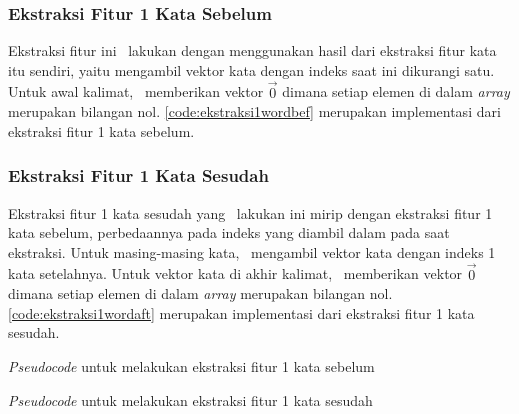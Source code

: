 \subsubsection{Ekstraksi Fitur 1 Kata Sebelum}
Ekstraksi fitur ini \saya~lakukan dengan menggunakan hasil dari ekstraksi fitur kata itu sendiri, yaitu mengambil vektor kata dengan indeks saat ini dikurangi satu. Untuk awal kalimat, \saya~memberikan vektor $ \vec{0} $ dimana setiap elemen di dalam \textit{array} merupakan bilangan nol. \ref{code:ekstraksi1wordbef} merupakan implementasi dari ekstraksi fitur 1 kata sebelum.

\subsubsection{Ekstraksi Fitur 1 Kata Sesudah}
Ekstraksi fitur 1 kata sesudah yang \saya~lakukan ini mirip dengan ekstraksi fitur 1 kata sebelum, perbedaannya pada indeks yang diambil dalam pada saat ekstraksi. Untuk masing-masing kata, \saya~mengambil vektor kata dengan indeks 1 kata setelahnya. Untuk vektor kata di akhir kalimat, \saya~memberikan vektor $ \vec{0} $ dimana setiap elemen di dalam \textit{array} merupakan bilangan nol. \ref{code:ekstraksi1wordaft} merupakan implementasi dari ekstraksi fitur 1 kata sesudah.

\begin{kode}	
	
	\SetAlgoLined

	\BlankLine
	
	\caption{\textit{Pseudocode} untuk melakukan ekstraksi fitur 1 kata sebelum}
	\label{code:ekstraksi1wordbef}	
\end{kode}

\begin{kode}
	
	
	\SetAlgoLined
	
	\BlankLine	
	\caption{\textit{Pseudocode} untuk melakukan ekstraksi fitur 1 kata sesudah}
	\label{code:ekstraksi1wordaft}
\end{kode}


